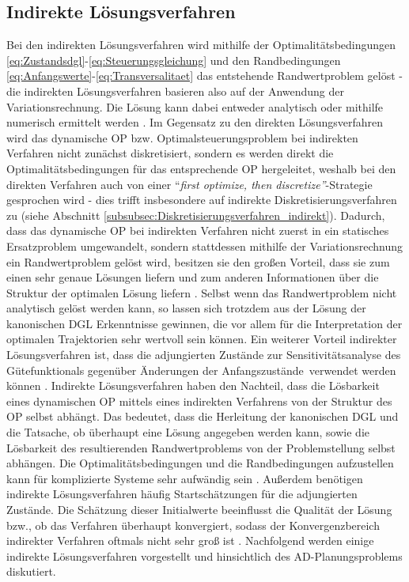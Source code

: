 \subsection{Indirekte Lösungsverfahren}\label{subsec:Indirekt}
Bei den indirekten Lösungsverfahren wird mithilfe der Optimalitätsbedingungen \eqref{eq:Zustandsdgl}-\eqref{eq:Steuerungsgleichung} und den Randbedingungen \eqref{eq:Anfangswerte}-\eqref{eq:Transversalitaet} das entstehende Randwertproblem gelöst \cite{Papageorgiou.2012} - die indirekten Lösungsverfahren basieren also auf der Anwendung der Variationsrechnung. Die Lösung kann dabei entweder analytisch oder mithilfe numerisch ermittelt werden \cite{Gerdts.2010}. Im Gegensatz zu den direkten Lösungsverfahren wird das dynamische \gls{OP} bzw. Optimalsteuerungsproblem bei indirekten Verfahren nicht zunächst diskretisiert, sondern es werden direkt die Optimalitätsbedingungen für das entsprechende \gls{OP} hergeleitet, weshalb bei den direkten Verfahren auch von einer ``\textit{first optimize, then discretize''}-Strategie gesprochen wird \cite{Papageorgiou.2012} - dies trifft insbesondere auf indirekte Diskretisierungsverfahren zu (siehe Abschnitt \ref{subsubsec:Diskretisierungsverfahren_indirekt}). Dadurch, dass das dynamische \gls{OP} bei indirekten Verfahren nicht zuerst in ein statisches Ersatzproblem umgewandelt, sondern stattdessen mithilfe der Variationsrechnung ein Randwertproblem gelöst wird, besitzen sie den großen Vorteil, dass sie zum einen sehr genaue Lösungen liefern und zum anderen Informationen über die Struktur der optimalen Lösung liefern \cite{KnutGraichen.2012}. Selbst wenn das Randwertproblem nicht analytisch gelöst werden kann, so lassen sich trotzdem aus der Lösung der kanonischen \gls{DGL} Erkenntnisse gewinnen, die vor allem für die Interpretation der optimalen Trajektorien sehr wertvoll sein können. Ein weiterer Vorteil indirekter Lösungsverfahren ist, dass die adjungierten Zustände zur Sensitivitätsanalyse des Gütefunktionals gegenüber Änderungen der Anfangszustände \xzero\,verwendet werden können \cite{KnutGraichen.2012}. Indirekte Lösungsverfahren haben den Nachteil, dass die Lösbarkeit eines dynamischen \gls{OP} mittels eines indirekten Verfahrens von der Struktur des \gls{OP} selbst abhängt. Das bedeutet, dass die Herleitung der kanonischen \gls{DGL} und die Tatsache, ob überhaupt eine Lösung angegeben werden kann, sowie die Lösbarkeit des resultierenden Randwertproblems von der Problemstellung selbst abhängen. Die Optimalitätsbedingungen und die Randbedingungen aufzustellen kann für komplizierte Systeme sehr aufwändig sein \cite{Papageorgiou.2012}. Außerdem benötigen indirekte Lösungsverfahren häufig Startschätzungen für die adjungierten Zustände. Die Schätzung dieser Initialwerte beeinflusst die Qualität der Lösung bzw., ob das Verfahren überhaupt konvergiert, sodass der Konvergenzbereich indirekter Verfahren oftmals nicht sehr groß ist \cite{Papageorgiou.2012}. Nachfolgend werden einige indirekte Lösungsverfahren vorgestellt und hinsichtlich des \gls{AD}-Planungsproblems diskutiert. 
